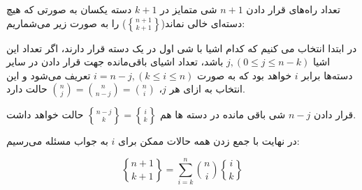     \p
    تعداد راه‌های قرار دادن
    $n+1$
    شی متمایز در
    $k+1$
    دسته یکسان به صورتی که هیچ دسته‌ای خالی نماند($\genfrac{\{}{\}}{0pt}{}{n + 1}{k + 1}$) را به صورت زیر می‌شماریم:
    
    \p
    در ابتدا انتخاب می کنیم که کدام اشیا با شی اول در یک دسته قرار دارند، اگر تعداد این اشیا $j, (0 \leq j \leq n - k)$ باشد،
    تعداد اشیای باقی‌مانده جهت قرار دادن در سایر دسته‌ها برابر
    $i$
    خواهد بود که به صورت
    $i= n-j ,(k \leq i \leq n)$
    تعریف می‌شود و این انتخاب
    به ازای هر $j$، ${n\choose j}={n \choose n-j}={n\choose i}$ حالت دارد.
    
    \p
	قرار دادن $n-j$ شی باقی مانده در دسته ها هم $\genfrac{\{}{\}}{0pt}{}{n-j}{k}=\genfrac{\{}{\}}{0pt}{}{i}{k}$ حالت خواهد داشت.

    
    \p
	در نهایت با جمع زدن همه حالات ممکن برای $i$ به جواب مسئله می‌رسیم:
    
    $$\genfrac{\{}{\}}{0pt}{}{n + 1}{k + 1} = \sum\limits_{i=k}^{n} {n\choose i} \genfrac{\{}{\}}{0pt}{}{i}{k}$$
